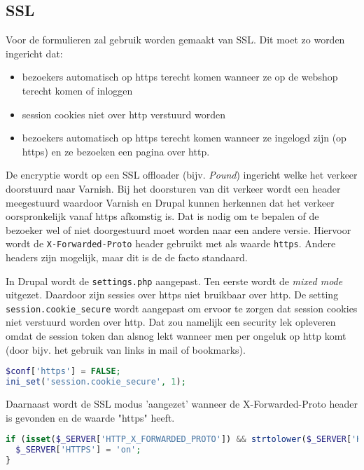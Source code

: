 \subsection{SSL}

Voor de formulieren zal gebruik worden gemaakt van SSL. Dit moet zo worden ingericht dat:
\begin{itemize}
\item bezoekers automatisch op https terecht komen wanneer ze op de webshop terecht komen of inloggen
\item session cookies niet over http verstuurd worden
\item bezoekers automatisch op https terecht komen wanneer ze ingelogd zijn (op https) en ze bezoeken een pagina over http.
\end{itemize}
 De encryptie wordt op een SSL offloader (bijv. \emph{Pound}) ingericht welke het verkeer doorstuurd naar Varnish. Bij het doorsturen van dit verkeer wordt een header meegestuurd waardoor Varnish en Drupal kunnen herkennen dat het verkeer oorspronkelijk vanaf https afkomstig is. Dat is nodig om te bepalen of de bezoeker wel of niet doorgestuurd moet worden naar een andere versie. Hiervoor wordt de \texttt{X-Forwarded-Proto} header gebruikt met als waarde \texttt{https}. Andere headers zijn mogelijk, maar dit is de de facto standaard.

In Drupal wordt de \texttt{settings.php} aangepast. Ten eerste wordt de \emph{mixed mode} uitgezet. Daardoor zijn sessies over https niet bruikbaar over http. De setting \texttt{session.cookie\_secure} wordt aangepast om ervoor te zorgen dat session cookies niet verstuurd worden over http. Dat zou namelijk een security lek opleveren omdat de session token dan alsnog lekt wanneer men per ongeluk op http komt (door bijv. het gebruik van links in mail of bookmarks).

\begin{lstlisting}[language=PHP]
$conf['https'] = FALSE;
ini_set('session.cookie_secure', 1);
\end{lstlisting}

Daarnaast wordt de SSL modus 'aangezet' wanneer de X-Forwarded-Proto header is gevonden en de waarde "https" heeft.

\begin{lstlisting}[language=PHP]
if (isset($_SERVER['HTTP_X_FORWARDED_PROTO']) && strtolower($_SERVER['HTTP_X_FORWARDED_PROTO']) == 'https') {
  $_SERVER['HTTPS'] = 'on';
}
\end{lstlisting}


